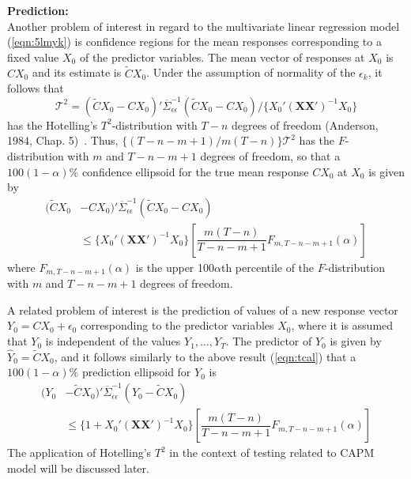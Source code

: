 \noindent \textbf{Prediction:} \\


Another problem of interest in regard to the multivariate linear regression model (\ref{eqn:5lmyk})
is confidence regions for the mean responses corresponding to a fixed value $X_0$ of the predictor variables. The mean vector of responses at $X_0$ is $CX_0$ and its estimate is $\tilde{C}X_0$. Under the assumption of normality of the $\epsilon_k$, it follows that
	\begin{equation}\label{eqn:tcal}
	\mathcal{T}^2=(\tilde{C}X_0-CX_0)' \overline{\Sigma}_{\epsilon\epsilon}^{-1} (\tilde{C}X_0-CX_0)/\{X_0'(\mathbf{X}\mathbf{X}')^{-1}X_0\}
	\end{equation}
has the Hotelling's $T^2$-distribution with $T-n$ degrees of freedom (Anderson, 1984, Chap. 5)~\cite{andersontw2}. Thus, $\{(T-n-m+1)/m(T-n)\}\mathcal{T}^2$ has the $F$-distribution with $m$ and $T-n-m+1$ degrees of freedom, so that a $100(1-\alpha)\%$ confidence ellipsoid for the true mean response $CX_0$ at $X_0$ is given by 
	\begin{equation}\label{eqn:52line}
	\begin{split}
	(\tilde{C}X_0 &-CX_0)' \overline{\Sigma}_{\epsilon\epsilon}^{-1}(\tilde{C}X_0-CX_0) \\
	 &\leq \{X_0' (\mathbf{X}\mathbf{X}')^{-1}X_0\} \left[ \dfrac{m(T-n)}{T-n-m+1} F_{m,T-n-m+1}(\alpha) \right]
	 \end{split}
	\end{equation}
where $F_{m,T-n-m+1}(\alpha)$ is the upper 100$\alpha$th percentile of the $F$-distribution with $m$ and $T-n-m+1$ degrees of freedom. 


A related problem of interest is the prediction of values of a new response vector $Y_0=CX_0+\epsilon_0$ corresponding to the predictor variables $X_0$, where it is assumed that $Y_0$ is independent of the values $Y_1,\ldots,Y_T$. The predictor of $Y_0$ is given by $\hat{Y}_0=\tilde{C}X_0$, and it follows similarly to the above result (\ref{eqn:tcal}) that a $100(1-\alpha)\%$ prediction ellipsoid for $Y_0$ is
	\begin{equation}\label{eqn:52another2}
	\begin{split}
	(Y_0 &-\tilde{C}X_0)' \overline{\Sigma}_{\epsilon\epsilon}^{-1}(Y_0-\tilde{C}X_0) \\
	&\leq\{1+X_0'(\mathbf{X}\mathbf{X}')^{-1} X_0\} \left[ \dfrac{m(T-n)}{T-n-m+1} F_{m,T-n-m+1}(\alpha) \right]
	\end{split}
	\end{equation}
The application of Hotelling's $T^2$ in the context of testing related to CAPM model will be discussed later.



